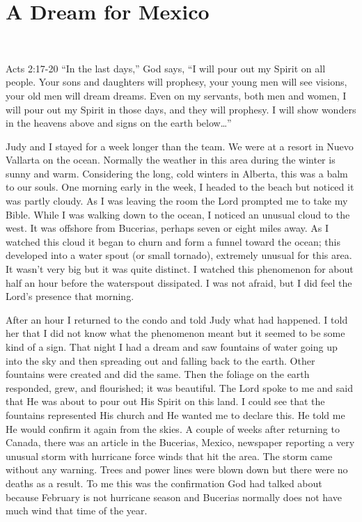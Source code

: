 \documentclass[twoside, 12pt]{book}
\begin{document}
\section{A Dream for Mexico}
\

Acts 2:17-20 “In the last days,” God says, “I will pour out my Spirit on all people. Your sons and daughters will prophesy, your young men will see visions, your old men will dream dreams. Even on my servants, both men and women, I will pour out my Spirit in those days, and they will prophesy. I will show wonders in the heavens above and signs on the earth below…”

Judy and I stayed for a week longer than the team. We were  at a resort in Nuevo Vallarta on the ocean. Normally the weather in this area during the winter is sunny and warm. Considering the long, cold winters in Alberta, this was a balm to our souls. One morning early in the week, I headed to the beach but noticed it was partly cloudy. As I was leaving the room the Lord prompted me to take my Bible. While I was walking down to the ocean, I noticed an unusual cloud to the west. It was offshore from Bucerias, perhaps seven or eight miles away. As I watched this cloud it began to churn and form a funnel toward the ocean; this developed into a water spout (or small tornado), extremely unusual for this area. It wasn’t very big but it was quite distinct. I watched this phenomenon for about half an hour before the waterspout dissipated. I was not afraid, but I did feel the Lord’s presence that morning.

After an hour I returned to the condo and told Judy what had happened. I told her that I did not know what the phenomenon meant but it seemed to be some kind of a sign. That night I had a dream and saw fountains of water going up into the sky and then spreading out and falling back to the earth. Other fountains were created and did the same. Then the foliage on the earth responded, grew, and flourished; it was beautiful. The Lord spoke to me and said that He was about to pour out His Spirit on this land. I could see that the fountains represented His church and He wanted me to declare this. He told me He would confirm it again from the skies. A couple of weeks after returning to Canada, there was an article in the Bucerias, Mexico, newspaper reporting a very unusual storm with hurricane force winds that hit the area. The storm came without any warning. Trees and power lines were blown down but there were no deaths as a result. To me this was the confirmation God had talked about because February is not hurricane season and Bucerias normally does not have much wind  that time of the year.
\end{document}
